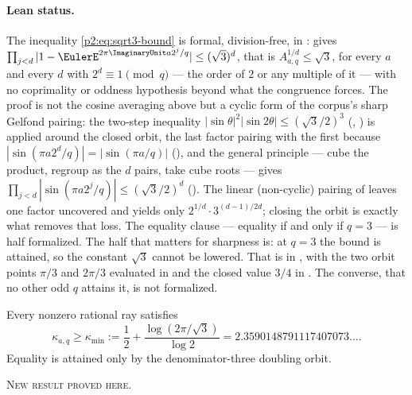 \documentclass[11pt,oneside]{article}
\theoremstyle{definition}
\theoremstyle{remark}
\newcommand{\newresult}{\textcolor{newgreen}{\textsc{New result proved here.}}}
\begin{document}
\paragraph{Lean status.}
The inequality \eqref{p2:eq:sqrt3-bound} is formal, division-free, in
:  gives
$\prod_{j<d}|1-\EulerE^{2\pi\ImaginaryUnit a2^j/q}|\le(\sqrt3)^{d}$, that is
$A_{a,q}^{1/d}\le\sqrt3$, for every $a$ and every $d$ with $2^{d}\equiv1\pmod q$ --- the
order of $2$ or any multiple of it --- with no coprimality or oddness hypothesis beyond
what the congruence forces.  The proof is not the cosine averaging above but a cyclic
form of the corpus's sharp Gelfond pairing: the two-step inequality
$|\sin\theta|^{2}|\sin2\theta|\le(\sqrt3/2)^{3}$
(, ) is
applied around the closed orbit, the last factor pairing with the first because
$|\sin(\pi a2^{d}/q)|=|\sin(\pi a/q)|$
(), and the general principle
 --- cube the product, regroup as the
$d$ pairs, take cube roots --- gives $\prod_{j<d}|\sin(\pi a2^{j}/q)|\le(\sqrt3/2)^{d}$
().  The linear (non-cyclic) pairing of
 leaves one factor uncovered and yields only
$2^{1/d}\cdot3^{(d-1)/2d}$; closing the orbit is exactly what removes that loss.  The
equality clause --- equality if and only if $q=3$ --- is half formalized.  The half that
matters for sharpness is: at $q=3$ the bound is attained, so the constant $\sqrt3$ cannot be
lowered.  That is  in
, with the two orbit points $\pi/3$ and $2\pi/3$ evaluated in
 and the closed value $3/4$ in
.  The converse, that no other odd $q$ attains it, is
not formalized.

\begin{corollary}\label{p2:cor:kappa-minimum}
Every nonzero rational ray satisfies
\begin{equation}
 \boxed{
 \kappa_{a,q}\ge\kappa_{\min}:=\frac12+\frac{\log(2\pi/\sqrt3)}{\log2}
 =2.3590148791117407073\ldots.}
 \label{p2:eq:kappa-minimum}
\end{equation}
Equality is attained only by the denominator-three doubling orbit.

\smallskip\noindent\newresult
\end{corollary}
\end{document}
